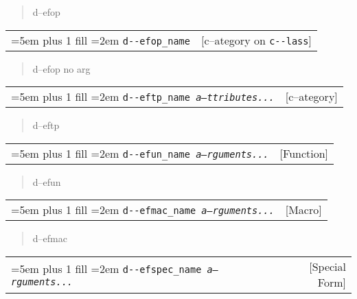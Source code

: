 \documentclass{book}
\begin{document}
%
\begin{quote}
\unskip{\parskip=0pt\noindent}%
d--efop
\end{quote}


\noindent\begin{tabularx}{\linewidth}{@{}Xr}
\rightskip=5em plus 1 fill
\hangindent=2em
\texttt{d{-}{-}efop\_name}& [c--ategory on \texttt{c{-}{-}lass}]
\end{tabularx}

%
\begin{quote}
\unskip{\parskip=0pt\noindent}%
d--efop no arg
\end{quote}


\noindent\begin{tabularx}{\linewidth}{@{}Xr}
\rightskip=5em plus 1 fill
\hangindent=2em
\texttt{d{-}{-}eftp\_name \EmbracOn{}\textnormal{\textsl{a--ttributes...}}\EmbracOff{}}& [c--ategory]
\end{tabularx}

%
\begin{quote}
\unskip{\parskip=0pt\noindent}%
d--eftp
\end{quote}


\noindent\begin{tabularx}{\linewidth}{@{}Xr}
\rightskip=5em plus 1 fill
\hangindent=2em
\texttt{d{-}{-}efun\_name \EmbracOn{}\textnormal{\textsl{a--rguments...}}\EmbracOff{}}& [Function]
\end{tabularx}

%
\begin{quote}
\unskip{\parskip=0pt\noindent}%
d--efun
\end{quote}


\noindent\begin{tabularx}{\linewidth}{@{}Xr}
\rightskip=5em plus 1 fill
\hangindent=2em
\texttt{d{-}{-}efmac\_name \EmbracOn{}\textnormal{\textsl{a--rguments...}}\EmbracOff{}}& [Macro]
\end{tabularx}

%
\begin{quote}
\unskip{\parskip=0pt\noindent}%
d--efmac
\end{quote}


\noindent\begin{tabularx}{\linewidth}{@{}Xr}
\rightskip=5em plus 1 fill
\hangindent=2em
\texttt{d{-}{-}efspec\_name \EmbracOn{}\textnormal{\textsl{a--rguments...}}\EmbracOff{}}& [Special Form]
\end{tabularx}
\end{document}
